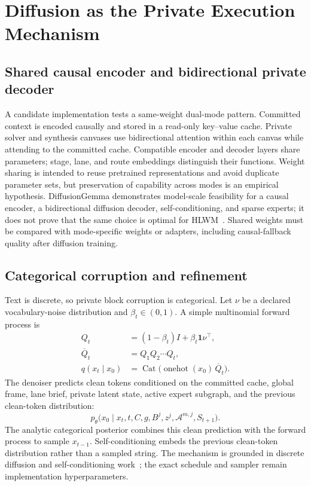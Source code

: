 \documentclass[10pt,a4paper]{article}
\newcommand{\op}[1]{\operatorname{#1}}
\newcommand{\Acal}{\mathcal{A}}
\begin{document}
\section{Diffusion as the Private Execution Mechanism}
\label{sec:diffusion}

\subsection{Shared causal encoder and bidirectional private decoder}

A candidate implementation tests a same-weight dual-mode pattern. Committed
context is encoded causally and stored in a read-only key--value cache. Private
solver and synthesis canvases use bidirectional attention within each canvas
while attending to the committed cache. Compatible encoder and decoder layers
share parameters; stage, lane, and route embeddings distinguish their
functions. Weight sharing is intended to reuse pretrained representations and
avoid duplicate parameter sets, but preservation of capability across modes is
an empirical hypothesis. DiffusionGemma demonstrates model-scale feasibility
for a causal encoder, a bidirectional diffusion decoder, self-conditioning,
and sparse experts; it does not prove that the same choice is optimal for
HLWM~\cite{diffusiongemma}. Shared weights must be compared with mode-specific
weights or adapters, including causal-fallback quality after diffusion
training.

\subsection{Categorical corruption and refinement}

Text is discrete, so private block corruption is categorical. Let $\nu$ be a
declared vocabulary-noise distribution and $\beta_t \in (0,1)$. A simple
multinomial forward process is
\begin{align}
Q_t &= (1 - \beta_t) I + \beta_t \mathbf{1} \nu^\top, \\
\overline{Q}_t &= Q_1 Q_2 \cdots Q_t, \\
q(x_t \mid x_0) &= \op{Cat}\bigl( \op{onehot}(x_0)\, \overline{Q}_t \bigr).
\end{align}
The denoiser predicts clean tokens conditioned on the committed cache, global
frame, lane brief, private latent state, active expert subgraph, and the
previous clean-token distribution:
\begin{equation}
p_\theta\bigl( x_0 \mid x_t, t, C, g, B^j, z^j, \Acal^{m,j}, S_{t+1} \bigr).
\end{equation}
The analytic categorical posterior combines this clean prediction with the
forward process to sample $x_{t-1}$. Self-conditioning embeds the previous
clean-token distribution rather than a sampled string. The mechanism is
grounded in discrete diffusion and self-conditioning
work~\cite{austin2021,chen2022,nie2025,arriola2025}; the exact schedule and
sampler remain implementation hyperparameters.
\end{document}
